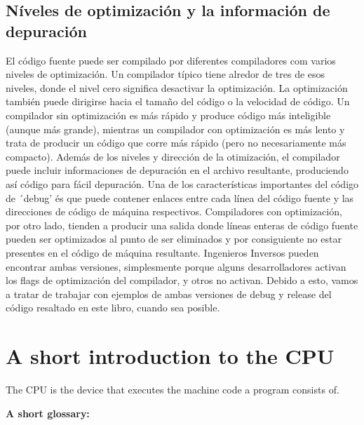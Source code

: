 \ifdefined\SPANISH
\section*{Níveles de optimización y la información de depuración}
El código fuente puede ser compilado por diferentes compiladores com varios niveles de optimización.
Un compilador típico tiene alredor de tres de esos niveles, donde el nivel cero significa desactivar la optimización.
La optimización también puede dirigirse hacia el tamaño del código o la velocidad de código.
Un compilador sin optimización es más rápido y produce código más inteligible (aunque más grande), 
mientras un compilador con optimización es más lento y trata de producir un código que corre más rápido (pero no necesariamente más compacto).
Además de los niveles y dirección de la otimización, el compilador puede incluir informaciones de depuración en el archivo resultante, produciendo así código para fácil depuración.
Una de los características importantes del código de ´debug' és que puede contener enlaces entre
cada línea del código fuente y las direcciones de código de máquina respectivos.
Compiladores con optimización, por otro lado, tienden a producir una salida donde líneas enteras de código fuente pueden ser optimizados al punto de ser eliminados y por consiguiente no estar presentes en el código de máquina resultante.
Ingenieros Inversos pueden encontrar ambas versiones, simplesmente porque alguns desarrolladores activan los flags de optimización del compilador, y otros no activan. 
Debido a esto, vamos a tratar de trabajar con ejemplos de ambas versiones de debug y release del código resaltado en este libro, cuando sea posible.
\fi %

\ifdefined\ENGLISH

\chapter{A short introduction to the CPU}

The \ac{CPU} is the device that executes the machine code a program consists of.

\textbf{A short glossary:}

